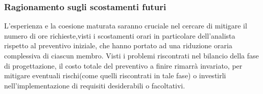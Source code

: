 \subsubsection{Ragionamento sugli scostamenti futuri}
L'esperienza e la coesione maturata saranno cruciale nel cercare di mitigare il numero di ore richieste,visti i scostamenti orari in particolare dell'analista rispetto al preventivo iniziale, che hanno portato ad una riduzione oraria complessiva di ciascun membro.
Visti i problemi riscontrati nel bilancio della fase di progettazione, il costo totale del preventivo a finire rimarrà invariato, per mitigare eventuali rischi(come quelli riscontrati in tale fase) o investirli nell'implementazione di requisiti desiderabili o facoltativi.
